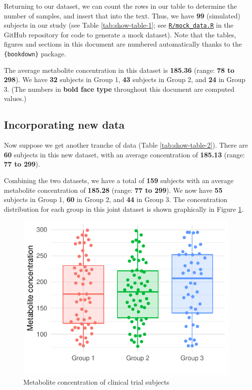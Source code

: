 \documentclass[smallextended]{svjour3}       %
\begin{document}
Returning to our dataset, we can count the rows in our table to determine the number of samples, and insert that into the text. Thus, we have \textbf{99} (simulated) subjects in our study (see Table \ref{tab:show-table-1}; see \href{https://github.com/jperkel/computed_manuscript/blob/main/R/mock_data.R}{\texttt{R/mock\_data.R}} in the GitHub repository for code to generate a mock dataset). Note that the tables, figures and sections in this document are numbered automatically thanks to the \texttt{\{bookdown\}} package.

The average metabolite concentration in this dataset is \textbf{185.36} (range: \textbf{78 to 298}). We have \textbf{32} subjects in Group 1, \textbf{43} subjects in Group 2, and \textbf{24} in Group 3. (The numbers in \textbf{bold face type} throughout this document are computed values.)

\hypertarget{sec:2}{%
\subsection{Incorporating new data}\label{sec:2}}

Now suppose we get another tranche of data (Table \ref{tab:show-table-2}). There are \textbf{60} subjects in this new dataset, with an average concentration of \textbf{185.13} (range: \textbf{77 to 299}).

Combining the two datasets, we have a total of \textbf{159} subjects with an average metabolite concentration of \textbf{185.28} (range: \textbf{77 to 299}). We now have \textbf{55} subjects in Group 1, \textbf{60} in Group 2, and \textbf{44} in Group 3. The concentration distribution for each group in this joint dataset is shown graphically in Figure \ref{fig:plot-data-1}.

\begin{figure}
\centering
\includegraphics{computed_manuscript_files/figure-latex/plot-data-1-1.pdf}
\caption{\label{fig:plot-data-1}Metabolite concentration of clinical trial subjects}
\end{figure}
\end{document}
